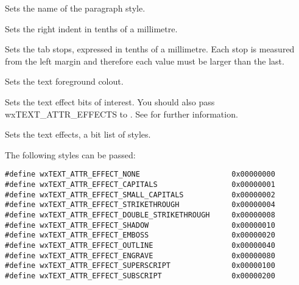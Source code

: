 Sets the name of the paragraph style.

\label{wxrichtextattrsetrightindent}


Sets the right indent in tenths of a millimetre.

\label{wxrichtextattrsettabs}


Sets the tab stops, expressed in tenths of a millimetre.
Each stop is measured from the left margin and therefore each value must be larger than the last.

\label{wxrichtextattrsettextcolour}


Sets the text foreground colout.

\label{wxrichtextattrsettexteffectflags}


Sets the text effect bits of interest. You should also pass wxTEXT\_ATTR\_EFFECTS to .
See  for further information.

\label{wxrichtextattrsettexteffects}


Sets the text effects, a bit list of styles.

The following styles can be passed:

{\small
\begin{verbatim}
#define wxTEXT_ATTR_EFFECT_NONE                     0x00000000
#define wxTEXT_ATTR_EFFECT_CAPITALS                 0x00000001
#define wxTEXT_ATTR_EFFECT_SMALL_CAPITALS           0x00000002
#define wxTEXT_ATTR_EFFECT_STRIKETHROUGH            0x00000004
#define wxTEXT_ATTR_EFFECT_DOUBLE_STRIKETHROUGH     0x00000008
#define wxTEXT_ATTR_EFFECT_SHADOW                   0x00000010
#define wxTEXT_ATTR_EFFECT_EMBOSS                   0x00000020
#define wxTEXT_ATTR_EFFECT_OUTLINE                  0x00000040
#define wxTEXT_ATTR_EFFECT_ENGRAVE                  0x00000080
#define wxTEXT_ATTR_EFFECT_SUPERSCRIPT              0x00000100
#define wxTEXT_ATTR_EFFECT_SUBSCRIPT                0x00000200
\end{verbatim}
}

